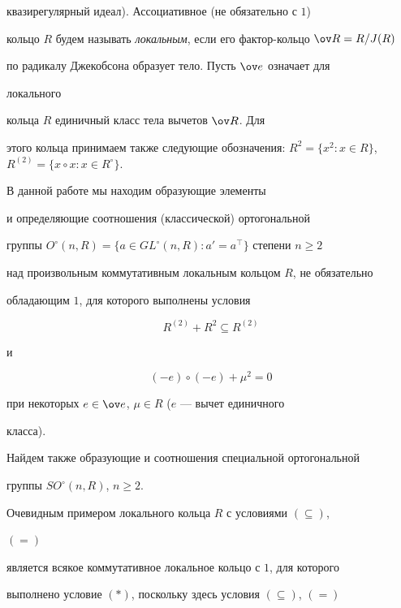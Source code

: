 квазирегулярный идеал). Ассоциативное (не обязательно с $1$) 


кольцо $R$ будем называть {\it локальным}, если его фактор-кольцо $\ov 


R=R/J(R)$ 


по радикалу Джекобсона образует тело. Пусть $\ov e$ означает для 


локального 


кольца $R$ единичный класс тела вычетов $\ov R$. Для 


этого кольца принимаем также следующие обозначения: $R^2=\{x^2:x\in 


R\}$, $R^{(2)}=\{x\circ x:x\in R^\circ\}$. 


В данной работе мы находим образующие элементы 


и определяющие соотношения (классической) ортогональной 


группы $O^\circ(n,R)=\{a\in GL^\circ(n,R):a'=a^\top\}$ степени $n\ge2$ 


над произвольным коммутативным локальным кольцом $R$, не обязательно 


обладающим $1$, для которого выполнены условия 


\begin{equation} 


R^{(2)}+R^2\subseteq R^{(2)}\tag{$\subseteq$} 


\end{equation} 


и 


\begin{equation} 


(-e)\circ(-e)+\mu^2=0\tag{$=$} 


\end{equation} 


при некоторых $e\in\ov e$, $\mu\in R$ ($e$ --- вычет единичного 


класса). 


Найдем также образующие и соотношения специальной ортогональной 


группы $SO^\circ(n,R)$, $n\ge2$. 


 


Очевидным примером локального кольца $R$ с условиями $(\subseteq)$, 


$(=)$ 


является всякое коммутативное локальное кольцо с $1$, для которого 


выполнено условие $(*)$, поскольку здесь условия $(\subseteq)$, $(=)$ 



